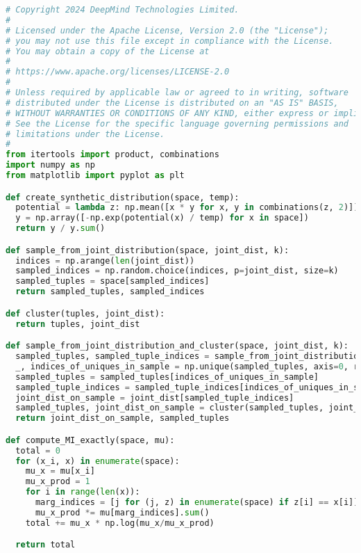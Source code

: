 \begin{lstlisting}[language=Python, caption={Implementation and usage examples of \Cref{alg:MI} and \Cref{alg:MI-se} on a synthetic joint distribution}, label={lst:MI}]
# Copyright 2024 DeepMind Technologies Limited.
#
# Licensed under the Apache License, Version 2.0 (the "License");
# you may not use this file except in compliance with the License.
# You may obtain a copy of the License at
#
# https://www.apache.org/licenses/LICENSE-2.0
#
# Unless required by applicable law or agreed to in writing, software
# distributed under the License is distributed on an "AS IS" BASIS,
# WITHOUT WARRANTIES OR CONDITIONS OF ANY KIND, either express or implied.
# See the License for the specific language governing permissions and
# limitations under the License.
#
from itertools import product, combinations
import numpy as np
from matplotlib import pyplot as plt

def create_synthetic_distribution(space, temp):
  potential = lambda z: np.mean([x * y for x, y in combinations(z, 2)])
  y = np.array([-np.exp(potential(x) / temp) for x in space])
  return y / y.sum()

def sample_from_joint_distribution(space, joint_dist, k):
  indices = np.arange(len(joint_dist))
  sampled_indices = np.random.choice(indices, p=joint_dist, size=k)
  sampled_tuples = space[sampled_indices]
  return sampled_tuples, sampled_indices

def cluster(tuples, joint_dist):
  return tuples, joint_dist

def sample_from_joint_distribution_and_cluster(space, joint_dist, k):
  sampled_tuples, sampled_tuple_indices = sample_from_joint_distribution(space, joint_dist, k)
  _, indices_of_uniques_in_sample = np.unique(sampled_tuples, axis=0, return_index=True)
  sampled_tuples = sampled_tuples[indices_of_uniques_in_sample]
  sampled_tuple_indices = sampled_tuple_indices[indices_of_uniques_in_sample]
  joint_dist_on_sample = joint_dist[sampled_tuple_indices]
  sampled_tuples, joint_dist_on_sample = cluster(sampled_tuples, joint_dist_on_sample)
  return joint_dist_on_sample, sampled_tuples

def compute_MI_exactly(space, mu):
  total = 0
  for (x_i, x) in enumerate(space):
    mu_x = mu[x_i]
    mu_x_prod = 1
    for i in range(len(x)):
      marg_indices = [j for (j, z) in enumerate(space) if z[i] == x[i]]
      mu_x_prod *= mu[marg_indices].sum()
    total += mu_x * np.log(mu_x/mu_x_prod)

  return total


\end{lstlisting}
